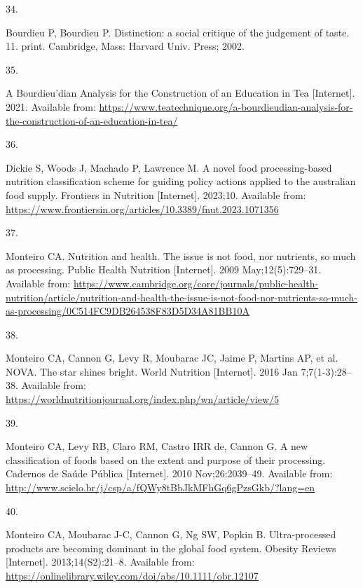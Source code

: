 \documentclass[
]{article}
\newlength{\cslhangindent}
\newlength{\csllabelwidth}
\newlength{\cslentryspacingunit} %
\newenvironment{CSLReferences}[2] %
 {%
  \setlength{\parindent}{0pt}
  \ifodd #1
  \let\oldpar\par
  \def\par{\hangindent=\cslhangindent\oldpar}
  \fi
  \setlength{\parskip}{#2\cslentryspacingunit}
 }%
 {}
\newcommand{\CSLLeftMargin}[1]{\parbox[t]{\csllabelwidth}{#1}}
\newcommand{\CSLRightInline}[1]{\parbox[t]{\linewidth - \csllabelwidth}{#1}\break}
\begin{document}
\begin{CSLReferences}{0}{0}
\leavevmode{}%
\CSLLeftMargin{34. }%
\CSLRightInline{Bourdieu P, Bourdieu P. Distinction: a social critique
of the judgement of taste. 11. print. Cambridge, Mass: Harvard Univ.
Press; 2002. }

\leavevmode{}%
\CSLLeftMargin{35. }%
\CSLRightInline{A Bourdieu{'}dian Analysis for the Construction of an
Education in Tea {[}Internet{]}. 2021. Available from:
\url{https://www.teatechnique.org/a-bourdieudian-analysis-for-the-construction-of-an-education-in-tea/}}

\leavevmode{}%
\CSLLeftMargin{36. }%
\CSLRightInline{Dickie S, Woods J, Machado P, Lawrence M. A novel food
processing-based nutrition classification scheme for guiding policy
actions applied to the australian food supply. Frontiers in Nutrition
{[}Internet{]}. 2023;10. Available from:
\url{https://www.frontiersin.org/articles/10.3389/fnut.2023.1071356}}

\leavevmode{}%
\CSLLeftMargin{37. }%
\CSLRightInline{Monteiro CA. Nutrition and health. The issue is not
food, nor nutrients, so much as processing. Public Health Nutrition
{[}Internet{]}. 2009 May;12(5):729--31. Available from:
\url{https://www.cambridge.org/core/journals/public-health-nutrition/article/nutrition-and-health-the-issue-is-not-food-nor-nutrients-so-much-as-processing/0C514FC9DB264538F83D5D34A81BB10A}}

\leavevmode{}%
\CSLLeftMargin{38. }%
\CSLRightInline{Monteiro CA, Cannon G, Levy R, Moubarac JC, Jaime P,
Martins AP, et al. NOVA. The star shines bright. World Nutrition
{[}Internet{]}. 2016 Jan 7;7(1-3):28--38. Available from:
\url{https://worldnutritionjournal.org/index.php/wn/article/view/5}}

\leavevmode{}%
\CSLLeftMargin{39. }%
\CSLRightInline{Monteiro CA, Levy RB, Claro RM, Castro IRR de, Cannon G.
A new classification of foods based on the extent and purpose of their
processing. Cadernos de Saúde Pública {[}Internet{]}. 2010
Nov;26:2039--49. Available from:
\url{http://www.scielo.br/j/csp/a/fQWy8tBbJkMFhGq6gPzsGkb/?lang=en}}

\leavevmode{}%
\CSLLeftMargin{40. }%
\CSLRightInline{Monteiro CA, Moubarac J-C, Cannon G, Ng SW, Popkin B.
Ultra-processed products are becoming dominant in the global food
system. Obesity Reviews {[}Internet{]}. 2013;14(S2):21--8. Available
from: \url{https://onlinelibrary.wiley.com/doi/abs/10.1111/obr.12107}}


\end{CSLReferences}
\end{document}
